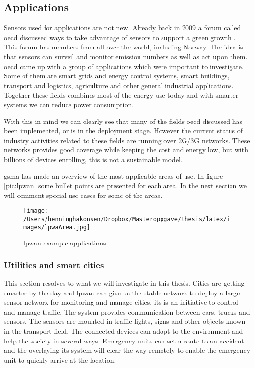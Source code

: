 \documentclass[USenglish]{ifimaster}  %
\begin{document}
\subsection{Applications}
Sensors used for applications are not new. Already back in 2009 a forum called \acrfull{oecd} discussed ways to take advantage of sensors to support a green growth \cite{online:industryApplications}. This forum has members from all over the world, including Norway. The idea is that sensors can surveil and monitor emission numbers as well as act upon them. \acrshort{oecd} came up with a group of applications which were important to investigate. Some of them are smart grids and energy control systems, smart buildings, transport and logistics, agriculture and other general industrial applications. Together these fields combines most of the energy use today and with smarter systems we can reduce power consumption.


With this in mind we can clearly see that many of the fields \acrshort{oecd} discussed has been implemented, or is in the deployment stage. However the current status of industry activities related to these fields are running over 2G/3G networks. These networks provides good coverage while keeping the cost and energy low, but with billions of devices enrolling, this is not a sustainable model.


\acrfull{gsma} has made an overview of the most applicable areas of use. In figure \vref{pic:lpwan} some bullet points are presented for each area. In the next section we will comment special use cases for some of the areas.

\begin{figure}[ht]
  \centering\texttt{[image: /Users/henninghakonsen/Dropbox/Masteroppgave/thesis/latex/images/lpwaArea.jpg]}
  \caption{\acrshort{lpwan} example applications \cite{online:lpwaFuture}}
  \label{pic:lpwan}
\end{figure}

\subsubsection{Utilities and smart cities}
This section resolves to what we will investigate in this thesis. Cities are getting smarter by the day and \acrshort{lpwan} can give us the stable network to deploy a large sensor network for monitoring and manage cities. \acrfull{its} is an initiative to control and manage traffic. The system provides communication between cars, trucks and sensors. The sensors are mounted in traffic lights, signs and other objects known in the transport field. The connected devices can adopt to the environment and help the society in several ways. Emergency units can set a route to an accident and the overlaying \acrshort{its} system will clear the way remotely to enable the emergency unit to quickly arrive at the location.
\end{document}
